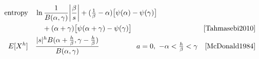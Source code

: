 \begin{table*}[p]
\begin{align*}
\\
\text{entropy} \quad  &   \ln \frac{1}{B(\alpha, \gamma)} \Left|\frac{\beta}{s}\Right|
  +(\tfrac{1}{\beta}-\alpha) \big[ \psi(\alpha) - \psi(\gamma)\big]
  \hspace{-7em} 
  \\
& \quad +(\alpha+\gamma) \big[ \psi(\alpha+\gamma) - \psi(\gamma)\big] \checked & \text{\cite[Eq.~(15)]{Tahmasebi2010}}
\\
E[ X^h]  \quad & \frac{|s|^h B(\alpha+\tfrac{h}{\beta},\gamma- \tfrac{h}{\beta}) }{B(\alpha,\gamma)} 
& \!\!a=0,\  -\alpha< \tfrac{h}{\beta} <\gamma \quad   \text{\cite{McDonald1984}} \checked
\end{align*}
\end{table*}


